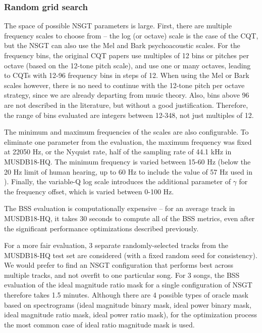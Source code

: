 \documentclass[report.tex]{subfiles}
\begin{document}
\subsubsection{Random grid search}

The space of possible NSGT parameters is large. First, there are multiple frequency scales to choose from -- the log (or octave) scale is the case of the CQT, but the NSGT can also use the Mel and Bark psychoacoustic scales. For the frequency bins, the original CQT papers \cite{klapuricqt, invertiblecqt} use multiples of 12 bins or pitches per octave (based on the 12-tone pitch scale), and use one or many octaves, leading to CQTs with 12-96 frequency bins in steps of 12. When using the Mel or Bark scales however, there is no need to continue with the 12-tone pitch per octave strategy, since we are already departing from music theory. Also, bins above 96 are not described in the literature, but without a good justification. Therefore, the range of bins evaluated are integers between 12-348, not just multiples of 12.

The minimum and maximum frequencies of the scales are also configurable. To eliminate one parameter from the evaluation, the maximum frequency was fixed at 22050 Hz, or the Nyquist rate, half of the sampling rate of 44.1 kHz in MUSDB18-HQ. The minimum frequency is varied between 15-60 Hz (below the 20 Hz limit of human hearing, up to 60 Hz to include the value of 57 Hz used in \cite{klapuricqt}). Finally, the variable-Q log scale introduces the additional parameter of $\gamma$ for the frequency offset, which is varied between 0-100 Hz.

The BSS evaluation is computationally expensive -- for an average track in MUSDB18-HQ, it takes 30 seconds to compute all of the BSS metrics, even after the significant performance optimizations described previously.


For a more fair evaluation, 3 separate randomly-selected tracks from the MUSDB18-HQ test set are considered (with a fixed random seed for consistency). We would prefer to find an NSGT configuration that performs best across multiple tracks, and not overfit to one particular song. For 3 songs, the BSS evaluation of the ideal magnitude ratio mask for a single configuration of NSGT therefore takes 1.5 minutes. Although there are 4 possible types of oracle mask based on spectrograms (ideal magnitude binary mask, ideal power binary mask, ideal magnitude ratio mask, ideal power ratio mask), for the optimization process the most common case of ideal ratio magnitude mask is used.
\end{document}
